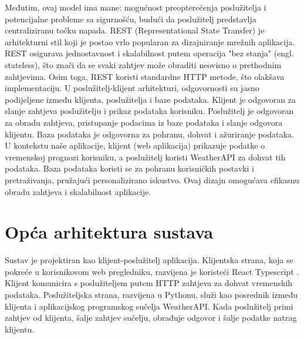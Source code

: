\documentclass[times, utf8, zavrsni]{fer}
\begin{document}
Međutim, ovaj model ima mane: mogućnost preopterećenja poslužitelja i potencijalne probleme sa sigurnošću, budući da poslužitelj predstavlja centraliziranu točku napada. REST (Representational State Transfer) je arhitekturni stil koji je postao vrlo popularan za dizajniranje mrežnih aplikacija. REST osigurava jednostavnost i skalabilnost putem operacija "bez stanja" (engl. stateless), što znači da se svaki zahtjev može obraditi neovisno o prethodnim zahtjevima. Osim toga, REST koristi standardne HTTP metode, što olakšava implementaciju. U poslužitelj-klijent arhitekturi, odgovornosti su jasno podijeljene između klijenta, poslužitelja i baze podataka. Klijent je odgovoran za slanje zahtjeva poslužitelju i prikaz podataka korisniku. Poslužitelj je odgovoran za obradu zahtjeva, pristupanje podacima iz baze podataka i slanje odgovora klijentu. Baza podataka je odgovorna za pohranu, dohvat i ažuriranje podataka. U kontekstu naše aplikacije, klijent (web aplikacija) prikazuje podatke o vremenskoj prognozi korisniku, a poslužitelj koristi WeatherAPI za dohvat tih podataka. Baza podataka koristi se za pohranu korisničkih postavki i pretraživanja, pružajući personalizirano iskustvo. Ovaj dizajn omogućava efikasnu obradu zahtjeva i skalabilnost aplikacije.

\section{Opća arhitektura sustava}

Sustav je projektiran kao klijent-poslužitelj aplikacija. Klijentska strana, koja se pokreće u korisnikovom web pregledniku, razvijena je koristeći React Typescript \cite{typescript-react}. Klijent komunicira s poslužiteljem putem HTTP zahtjeva za dohvat vremenskih podataka. Poslužiteljska strana, razvijena u Pythonu, služi kao posrednik između klijenta i aplikacijskog programskog sučelja WeatherAPI. Kada poslužitelj primi zahtjev od klijenta, šalje zahtjev sučelju, obrađuje odgovor i šalje podatke natrag klijentu.
\end{document}
